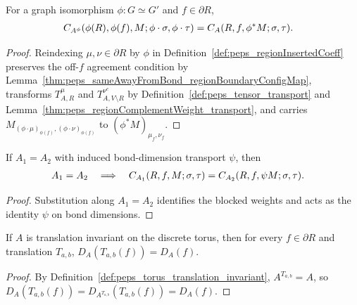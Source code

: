 \begin{lemma}%
    \label{thm:peps_regionInsertedCoeff_transport}
    \leanok
    For a graph isomorphism $\phi:G\simeq G'$ and $f\in\partial R$,
    \begin{align}
        C_{A^\phi}(\phi(R),\phi(f),M;\phi\cdot\sigma,\phi\cdot\tau)
         & =C_A(R,f,\phi^{*}M;\sigma,\tau).
        \notag
    \end{align}
\end{lemma}
\begin{proof}\leanok
    Reindexing $\mu,\nu\in\partial R$ by $\phi$ in
    Definition~\ref{def:peps_regionInsertedCoeff} preserves the off-$f$
    agreement condition by
    Lemma~\ref{thm:peps_sameAwayFromBond_regionBoundaryConfigMap}, transforms
    $T_{A,R}^{\mu}$ and $T_{A,V\setminus R}^{\nu^c}$ by
    Definition~\ref{def:peps_tensor_transport} and
    Lemma~\ref{thm:peps_regionComplementWeight_transport}, and carries
    $M_{(\phi\cdot\mu)_{\phi(f)},(\phi\cdot\nu)_{\phi(f)}}$ to
    $(\phi^{*}M)_{\mu_f,\nu_f}$.
\end{proof}

\begin{lemma}%
    \label{thm:peps_regionInsertedCoeff_congrTensor}
    \leanok
    If $A_1=A_2$ with induced bond-dimension transport $\psi$, then
    \begin{align}
        A_1=A_2
        \quad\Longrightarrow\quad
        C_{A_1}(R,f,M;\sigma,\tau)
         & =C_{A_2}(R,f,\psi M;\sigma,\tau).
        \notag
    \end{align}
\end{lemma}
\begin{proof}\leanok
    Substitution along $A_1=A_2$ identifies the blocked weights and acts as the
    identity $\psi$ on bond dimensions.
\end{proof}

\begin{lemma}%
    \label{thm:peps_bondDim_boundaryEdgeMap_translate}
    \leanok
    If $A$ is translation invariant on the discrete torus, then for every
    $f\in\partial R$ and translation $T_{a,b}$,
    $D_A(T_{a,b}(f))=D_A(f)$.
\end{lemma}
\begin{proof}\leanok
    By Definition~\ref{def:peps_torus_translation_invariant}, $A^{T_{a,b}}=A$,
    so $D_A(T_{a,b}(f))=D_{A^{T_{a,b}}}(T_{a,b}(f))=D_A(f)$.
\end{proof}

